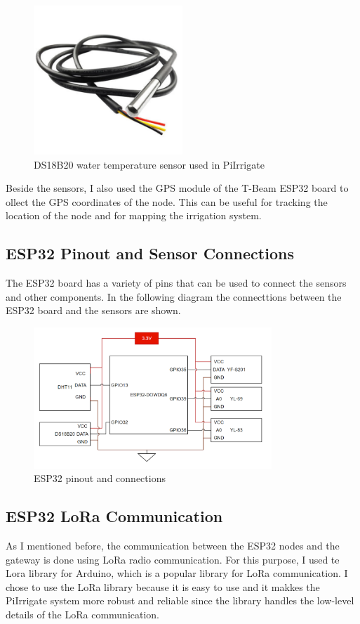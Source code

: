 \begin{figure}[H]
    \centering
    \includegraphics[width=0.5\textwidth]{images/water-temp.png}
    \caption{DS18B20 water temperature sensor used in PiIrrigate}
    \label{fig:ds18b20}
\end{figure}

Beside the sensors, I also used the GPS module of the T-Beam ESP32 board to 
ollect the GPS coordinates of the node. 
This can be useful for tracking the location of the node and for mapping the irrigation system.

\subsection{ESP32 Pinout and Sensor Connections}
The ESP32 board has a variety of pins that can be used to connect the sensors and other components.
In the following diagram the connecttions between the ESP32 board and the sensors are shown.
\begin{figure}[H]
    \centering
    \includegraphics[width=0.8\textwidth]{images/esp-diagram.png}
    \caption{ESP32 pinout and connections}
    \label{fig:esp32-pinout}
\end{figure}

\subsection{ESP32 LoRa Communication}
As I mentioned before, the communication between the ESP32 nodes and the gateway is done using
LoRa radio communication. For this purpose, I used te Lora library for Arduino, which is a 
popular library for LoRa communication. 
I chose to use the LoRa library because it is easy to use and it makkes the PiIrrigate system more
robust and reliable since the library handles the low-level details of the LoRa communication.

